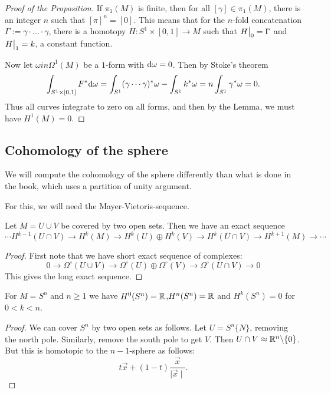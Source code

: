 \documentclass[11pt, english]{article}
\begin{document}
\begin{proof}[Proof of the Proposition]
If $\pi_1(M)$ is finite, then for all $[\gamma] \in \pi_1(M)$, there is an integer $n$ such that $[\pi]^n = [0]$. This means that for the $n$-fold concatenation $\Gamma := \gamma \cdot \ldots \cdot \gamma$, there is a homotopy $H:S^1 \times [0,1] \to M$ such that $\restr{H}{0}=\Gamma$ and $\restr{H}{1}=k$, a constant function. 

Now let $\omega in \Omega^1(M)$ be a $1$-form with $\mathrm{d}{\omega} = 0$. Then by Stoke's theorem
\[
\int_{S^1 \times [0,1]} F^\ast \mathrm{d}{\omega} = \int_{S^1} (\gamma \cdots \gamma)^\ast \omega - \int_{S^1} k^\ast \omega = n \int_{S^1} \gamma^\ast \omega = 0.
\]
Thus all curves integrate to zero on all forms, and then by the Lemma, we must have $H^1(M)=0$.
\end{proof}


\subsection{Cohomology of the sphere}

We will compute the cohomology of the sphere differently than what is done in the book, which uses a partition of unity argument.

For this, we will need the Mayer-Vietoris-sequence.

\begin{prop}
Let $M=U \cup V$ be covered by two open sets. Then we have an exact sequence
\[
 \cdots H^{k-1}(U \cap V) \to H^k(M) \to H^k(U) \oplus H^k(V) \to H^k(U \cap V) \to H^{k+1}(M) \to \cdots
\]
\end{prop}
\begin{proof}
  First note that we have short exact sequence of complexes:
\[
0 \to \Omega^\circ(U \cup V) \to \Omega^\circ(U) \oplus \Omega^\circ(V) \to \Omega^\circ(U \cap V) \to 0
\]
This gives the long exact sequence.
\end{proof}

\begin{corr}
For $M=S^n$ and $n \geq 1$ we have $H^0(S^n)=\mathbb{R}$,$H^n(S^n)=\mathbb{R}$ and $H^k(S^n)=0$ for $0 < k < n$. 
\end{corr}
\begin{proof}
We can cover $S^n$ by two open sets as follows. Let $U=S^n\{ N\}$, removing the north pole. Similarly, remove the south pole to get $V$. Then $U \cap V \approx \mathbb{R}^n \backslash \{ 0 \}$. But this is homotopic to the $n-1$-sphere as follows:
\[
t \vec x + (1-t) \frac{\vec x}{\mid \vec x \mid }.
\]
\end{proof}
\end{document}
